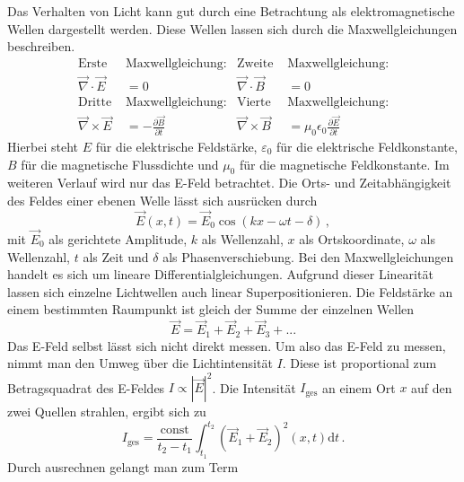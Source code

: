Das Verhalten von Licht kann gut durch eine Betrachtung als elektromagnetische Wellen
dargestellt werden. Diese Wellen lassen sich durch die Maxwellgleichungen beschreiben.
\begin{align*}
    \text{Erste } & \text{Maxwellgleichung:} & \text{Zweite } & \text{Maxwellgleichung:} \\
    \vec{\nabla} \cdot \vec{E} &= 0 & \vec{\nabla} \cdot \vec{B} &= 0 \\
    \text{Dritte } & \text{Maxwellgleichung:} & \text{Vierte } & \text{Maxwellgleichung:} \\
    \vec{\nabla} \times \vec{E} &= - \frac{\partial \vec{B}}{\partial t}   &  \vec{\nabla} \times \vec{B} &= \mu_0 \epsilon_0 \frac{\partial \vec{E}}{\partial t}
\end{align*}
Hierbei steht $E$ für die elektrische Feldstärke, $ε_0$ für die elektrische Feldkonstante,
$B$ für die magnetische Flussdichte und $μ_0$ für die magnetische Feldkonstante.
Im weiteren Verlauf wird nur das E-Feld betrachtet.
Die Orts- und Zeitabhängigkeit des Feldes einer ebenen Welle lässt sich ausrücken durch
\begin{equation}\label{eq:ebeneWelle}
    \vec{E}\left(x,t\right) = \vec{E}_0 \cos\left( k x - ω t - δ\right)\, ,
\end{equation}
mit $\vec{E}_0$ als gerichtete Amplitude, $k$ als Wellenzahl, $x$ als Ortskoordinate, $ω$ als Wellenzahl, $t$ als Zeit und $δ$ als Phasenverschiebung.
Bei den Maxwellgleichungen handelt es sich um lineare Differentialgleichungen.
Aufgrund dieser Linearität lassen sich einzelne Lichtwellen auch linear Superpositionieren.
Die Feldstärke an einem bestimmten Raumpunkt ist gleich der Summe der einzelnen Wellen
\begin{equation*}
    \vec{E} = \vec{E}_1 + \vec{E}_2 + \vec{E}_3 + ...
\end{equation*}
Das E-Feld selbst lässt sich nicht direkt messen.
Um also das E-Feld zu messen, nimmt man den Umweg über die Lichtintensität $I$.
Diese ist proportional zum Betragsquadrat des E-Feldes $I \propto |\vec{E}|^2$.
Die Intensität $I_{\text{ges}}$ an einem Ort $x$ auf den zwei Quellen strahlen,
ergibt sich zu 
\begin{equation*}
    I_{\text{ges}} = \frac{\text{const}}{t_2 - t_1} \int_{t_1}^{t_2} \left( \vec{E}_1 + \vec{E}_2 \right)^2 \left(x,t\right) \text{d}t\, .
\end{equation*}
Durch ausrechnen gelangt man zum Term
